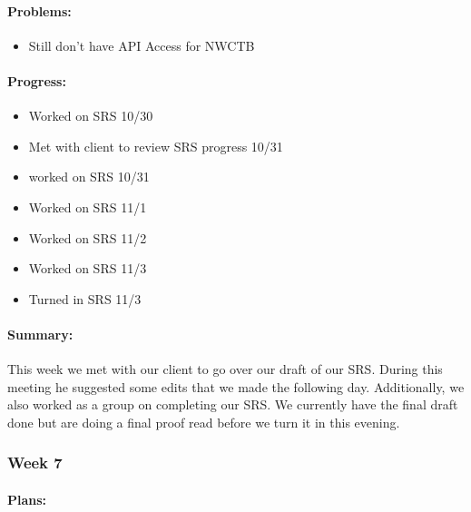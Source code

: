 \documentclass[onecolumn, draftclsnofoot,10pt, compsoc]{article}
\begin{document}
		    \paragraph{Problems:} \hfill \break
		        
		        \begin{itemize}
		            \item Still don't have API Access for NWCTB
		        \end{itemize}
		        
		    \paragraph{Progress:} \hfill \break
		    
		        \begin{itemize}
		            \item Worked on SRS 10/30
		            \item Met with client to review SRS progress 10/31
		            \item worked on SRS 10/31
		            \item Worked on SRS 11/1
		            \item Worked on SRS 11/2
		            \item Worked on SRS 11/3
		            \item Turned in SRS 11/3
		        \end{itemize}
		
		    \paragraph{Summary:} \hfill \break
		        This week we met with our client to go over our draft of our SRS. During this meeting he suggested some edits that we made the following day. Additionally, we also worked as a group on completing our SRS. We currently have the final draft done but are doing a final proof read before we turn it in this evening.\\
		
		\subsubsection{Week 7}
		
		    \paragraph{Plans:} \hfill \break
		
\end{document}
